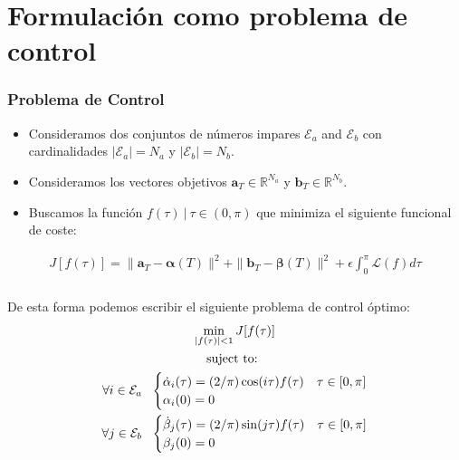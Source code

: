 \section{Formulación como problema de control}
\begin{frame}
    \frametitle{Problema de Control}
    \begin{problem}\label{OCP1}
        \begin{itemize}
            \item Consideramos dos conjuntos de números impares $\mathcal{E}_a$ and $\mathcal{E}_b$ con cardinalidades $|\mathcal{E}_a| = N_a$ y  $|\mathcal{E}_b| = N_b$.
            \item Consideramos los vectores objetivos $\bm{a}_T  \in \mathbb{R}^{N_a}$ y $\bm{b}_T  \in \mathbb{R}^{N_b}$.
            \item Buscamos la función  $f(\tau ) \ | \ \tau \in (0,\pi)$ que minimiza el siguiente funcional de coste:

        \end{itemize}
            \begin{gather}
            J[f(\tau)] =  \| \bm{a}_T - \bm{\alpha}(T)\|^2 + \| \bm{b}_T - \bm{\beta}(T)\|^2 
            + \epsilon \int_0^{\pi} \mathcal{L}(f) d\tau  
        \end{gather}
    \end{problem}
\end{frame}

\begin{frame}
    \frametitle{}
    \begin{problem}
    De esta forma podemos escribir el siguiente problema de control óptimo:
    \begin{gather}
        \min_{|f(\tau) |<1} J[f(\tau)] \\
        \notag \text{suject to: } \\
        \notag \forall i \in \mathcal{E}_a\ \ 
        \begin{cases}
            \dot{\alpha}_i(\tau) = (2/\pi) \cos(i\tau) f(\tau) & \tau \in [0,\pi]\label{dyn}\\
            \alpha_i(0) = 0
        \end{cases} \\
        \notag \forall j \in \mathcal{E}_b\ \ 
        \begin{cases}
            \dot{\beta}_j(\tau) = (2/\pi) \sin(j\tau) f(\tau) & \tau \in [0,\pi]\label{dyn}\\
            \beta_j(0) = 0
        \end{cases} \\
    \end{gather}
    \end{problem}
\end{frame}



